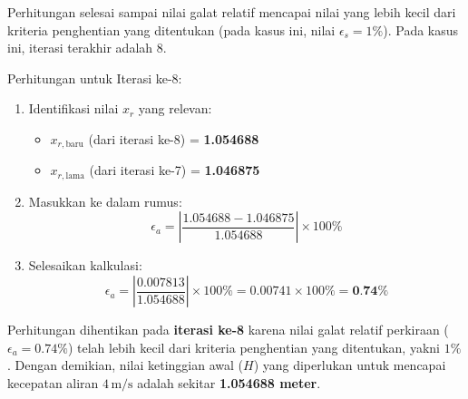 \documentclass[conference]{IEEEtran}
\begin{document}
Perhitungan selesai sampai nilai galat relatif mencapai nilai yang lebih kecil dari kriteria penghentian yang ditentukan (pada kasus ini, nilai $\epsilon_s = 1\%$). Pada kasus ini, iterasi terakhir adalah 8.

Perhitungan untuk Iterasi ke-8:
\begin{enumerate}
    \item Identifikasi nilai $x_r$ yang relevan:
    \begin{itemize}
        \item $x_{r, \text{baru}}$ (dari iterasi ke-8) = \textbf{1.054688}
        \item $x_{r, \text{lama}}$ (dari iterasi ke-7) = \textbf{1.046875}
    \end{itemize}
    
    \item Masukkan ke dalam rumus:
    \begin{equation}
    \epsilon_a = \left| \frac{1.054688 - 1.046875}{1.054688} \right| \times 100\%
    \end{equation}
    
    \item Selesaikan kalkulasi:
    \begin{equation}
    \epsilon_a = \left| \frac{0.007813}{1.054688} \right| \times 100\% = 0.00741 \times 100\% = \textbf{0.74\%}
    \end{equation}
\end{enumerate}
Perhitungan dihentikan pada \textbf{iterasi ke-8} karena nilai galat relatif perkiraan ($\epsilon_a = 0.74\%$) telah lebih kecil dari kriteria penghentian yang ditentukan, yakni $1\%$. Dengan demikian, nilai ketinggian awal ($H$) yang diperlukan untuk mencapai kecepatan aliran $4 \, \text{m/s}$ adalah sekitar \textbf{1.054688 meter}. \\
\end{document}
